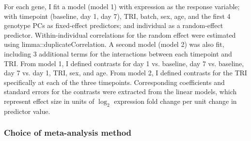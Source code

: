 For each gene, I fit a model (model 1) with expression as the response variable; with timepoint (baseline, day 1, day 7), \gls{TRI}, batch, sex, age, and the first 4 genotype \glspl{PC} as fixed-effect predictors; and individual as a random-effect predictor.
Within-individual correlations for the random effect were estimated using limma::duplicateCorrelation.
A second model (model 2) was also fit, including 3 additional terms for the interactions between each timepoint and \gls{TRI}.
From model 1, I defined contrasts for day 1 vs. baseline, day 7 vs. baseline, day 7 vs. day 1, \gls{TRI}, sex, and age.
From model 2, I defined contrasts for the \gls{TRI} specifically at each of the three timepoints.
Corresponding coefficients and standard errors for the contrasts were extracted from the linear models, which represent effect size in units of $\log_2$ expression fold change per unit change in predictor value.

\subsubsection{Choice of  meta-analysis method}

